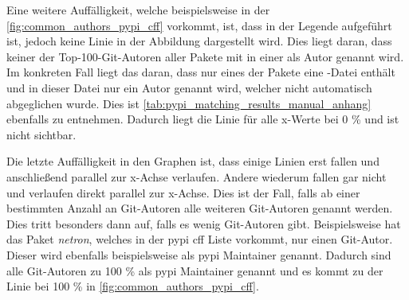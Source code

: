 Eine weitere Auffälligkeit, welche beispielsweise in der \autoref{fig:common_authors_pypi_cff} vorkommt, ist, dass in der Legende  aufgeführt ist, jedoch keine Linie in der Abbildung dargestellt wird.
Dies liegt daran, dass keiner der Top-100-Git-Autoren aller Pakete mit  in einer  als Autor genannt wird.
Im konkreten Fall liegt das daran, dass nur eines der Pakete eine -Datei enthält und in dieser Datei nur ein Autor genannt wird, welcher nicht automatisch abgeglichen wurde.
Dies ist \autoref{tab:pypi_matching_results_manual_anhang} ebenfalls zu entnehmen.
Dadurch liegt die Linie für alle x-Werte bei 0 \% und ist nicht sichtbar.

Die letzte Auffälligkeit in den Graphen ist, dass einige Linien erst fallen und anschließend parallel zur x-Achse verlaufen.
Andere wiederum fallen gar nicht und verlaufen direkt parallel zur x-Achse.
Dies ist der Fall, falls ab einer bestimmten Anzahl an Git-Autoren alle weiteren Git-Autoren genannt werden.
Dies tritt besonders dann auf, falls es wenig Git-Autoren gibt.
Beispielsweise hat das Paket \emph{netron}, welches in der \gls{pypi} \gls{cff} Liste vorkommt, nur einen Git-Autor.
Dieser wird ebenfalls beispielsweise als \gls{pypi} Maintainer genannt.
Dadurch sind alle Git-Autoren zu 100 \% als \gls{pypi} Maintainer genannt und es kommt zu der Linie bei 100 \% in \autoref{fig:common_authors_pypi_cff}.

